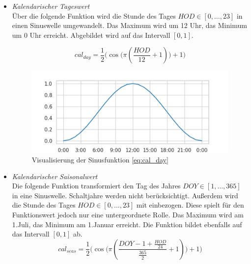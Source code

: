 \documentclass[
12pt, %
toc=listofnumbered, %
toc=chapterentrydotfill, %
numbers=noenddot, %
captions=tableheading, %
bibliography=numbered
]{scrreprt}
\begin{document}
\begin{itemize}
	\item \textit{Kalendarischer Tageswert}\\
	Über die folgende Funktion wird die Stunde des Tages $HOD \in [0, \dots, 23]$ in einen Sinuswelle umgewandelt. Das Maximum wird um 12 Uhr, das Minimum um 0 Uhr erreicht. Abgebildet wird auf das Intervall $[0,1]$.
	
	\begin{equation}\label{eq:cal_day}
		cal_{day} = \frac{1}{2}\Big(\cos \big(\pi (\frac{HOD}{12}+ 1)\big) + 1 \Big)
	\end{equation}

	\begin{figure}[tph]
		\begin{center}
			\includegraphics[]{./images/sinuszeit.png}
			\caption{Visualisierung der Sinusfunktion \ref{eq:cal_day}}
			\label{fig:sinustag}
		\end{center}
	\end{figure}
	
	\item \textit{Kalendarischer Saisonalwert}\\
	Die folgende Funktion transformiert den Tag des Jahres $DOY \in [1, \dots, 365]$ in eine Sinuswelle. Schaltjahre werden nicht berücksichtigt. Außerdem wird die Stunde des Tages $HOD \in [0, \dots, 23]$ mit einbezogen. Diese spielt für den Funktionswert jedoch nur eine untergeordnete Rolle. Das Maximum wird am 1.Juli, das Minimum am 1.Januar erreicht. Die Funktion bildet ebenfalls auf das Intervall $[0,1]$ ab.
	\begin{equation}\label{eq:cal_seas}
		cal_{seas} = \frac{1}{2}\Big(\cos\big(\pi (\frac{DOY -1 + \frac{HOD}{24}}{\frac{365}{2}}+ 1)\big) + 1\Big)
	\end{equation}
	

\end{itemize}
\end{document}
